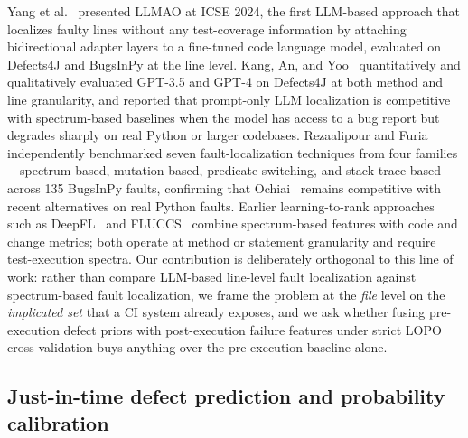 \documentclass[preprint,12pt]{elsarticle}
\begin{document}
Yang et al.~\cite{yang2024llmao} presented LLMAO at ICSE 2024, the first LLM-based approach that localizes faulty lines without any test-coverage information by attaching bidirectional adapter layers to a fine-tuned code language model, evaluated on Defects4J and BugsInPy at the line level. Kang, An, and Yoo~\cite{kang2024llmfl} quantitatively and qualitatively evaluated GPT-3.5 and GPT-4 on Defects4J at both method and line granularity, and reported that prompt-only LLM localization is competitive with spectrum-based baselines when the model has access to a bug report but degrades sharply on real Python or larger codebases. Rezaalipour and Furia~\cite{rezaalipour2024pyfl} independently benchmarked seven fault-localization techniques from four families---spectrum-based, mutation-based, predicate switching, and stack-trace based---across 135 BugsInPy faults, confirming that Ochiai~\cite{abreu2009spectrum} remains competitive with recent alternatives on real Python faults. Earlier learning-to-rank approaches such as DeepFL~\cite{li2019deepfl} and FLUCCS~\cite{sohn2017fluccs} combine spectrum-based features with code and change metrics; both operate at method or statement granularity and require test-execution spectra. Our contribution is deliberately orthogonal to this line of work: rather than compare LLM-based line-level fault localization against spectrum-based fault localization, we frame the problem at the \emph{file} level on the \emph{implicated set} that a CI system already exposes, and we ask whether fusing pre-execution defect priors with post-execution failure features under strict LOPO cross-validation buys anything over the pre-execution baseline alone.

\subsection{Just-in-time defect prediction and probability calibration}
\end{document}
